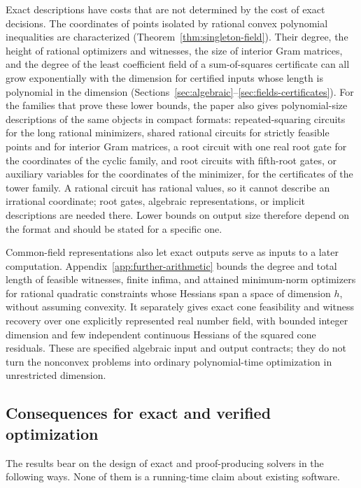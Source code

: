 Exact descriptions have costs that are not determined by the cost of exact
decisions. The coordinates of points isolated by rational convex polynomial
inequalities are characterized (Theorem~\ref{thm:singleton-field}). Their
degree, the height of rational optimizers and witnesses, the size of interior
Gram matrices, and the degree of the least coefficient field of a
sum-of-squares certificate can all grow exponentially with the dimension for
certified inputs whose length is polynomial in the dimension
(Sections~\ref{sec:algebraic}--\ref{sec:fields-certificates}). For the
families that prove these lower bounds, the paper also gives polynomial-size
descriptions of the same objects in compact formats: repeated-squaring
circuits for the long rational minimizers, shared rational circuits for
strictly feasible points and for interior Gram matrices, a root circuit with
one real root gate for the coordinates of the cyclic family, and root
circuits with fifth-root gates, or auxiliary variables for the coordinates of
the minimizer, for the certificates of the tower family. A rational circuit
has rational values, so it cannot describe an irrational coordinate; root
gates, algebraic representations, or implicit descriptions are needed there.
Lower bounds on output size therefore depend on the format and should be
stated for a specific one.

Common-field representations also let exact outputs serve as inputs to a
later computation. Appendix~\ref{app:further-arithmetic} bounds the degree
and total length of feasible witnesses, finite infima, and attained
minimum-norm optimizers for rational quadratic constraints whose Hessians
span a space of dimension $h$, without assuming convexity. It separately
gives exact cone feasibility and witness recovery over one explicitly
represented real number field, with bounded integer dimension and few
independent continuous Hessians of the squared cone residuals. These are
specified algebraic input and output contracts; they do not turn the
nonconvex problems into ordinary polynomial-time optimization in unrestricted
dimension.

\subsection{Consequences for exact and verified optimization}
\label{sec:discussion-consequences}

The results bear on the design of exact and proof-producing solvers in the
following ways. None of them is a running-time claim about existing
software.

